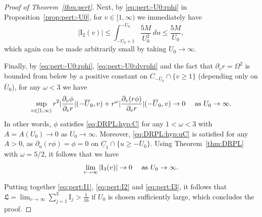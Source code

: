 \documentclass[12 pt, reqno]{amsart}
\theoremstyle{definition}
\theoremstyle{remark}
\numberwithin{equation}{section}
\newcommand{\abs}[1]{\vert#1\vert}
\newcommand{\set}[1]{\{#1\}}
\newcommand{\ud}{d}
\newcommand{\rd}{\partial}
\newcommand{\0}{\emptyset}
\newcommand{\omg}{\omega}
\newcommand{\Omg}{\Omega}
\newcommand{\uC}{\underline{C}}
\newcommand{\Ufree}{U_{0}}
\newcommand{\Ufixed}{\overline{U}_{0}}
\begin{document}
\begin{proof} [Proof of Theorem~\ref{thm:pert}]
Next, by \eqref{eq:pert:-U0:rphi} in Proposition~\ref{prop:pert:-U0}, for $v \in [1, \infty)$ we immediately have
\begin{equation} \label{eq:pert:I2}
	\abs{\mathrm{I_{2}}(v)} \leq \int_{-\Ufree+1}^{-\Ufixed} \frac{5M}{\Ufree^{2}} \, \ud u \leq \frac{5M}{\Ufree},
\end{equation}
which again can be made arbitrarily small by taking $\Ufree \to \infty$.

Finally, by \eqref{eq:pert:-U0:rphi}, \eqref{eq:pert:-U0:dvrphi} and the fact that $\rd_{v} r = \Omg^2$ is bounded from below by a positive constant on $C_{-\Ufixed} \cap \set{v \geq 1}$ (depending only on $\Ufixed$), for any $\omg < 3$ we have
\begin{equation*}
	\sup_{v \in [1, \infty)} r^{2} \abs{\frac{\rd_{v} \phi}{\rd_{v} r}}(-\Ufixed, v) + r^{\omg} \abs{\frac{\rd_{v}(r \phi)}{\rd_{v} r}} (-\Ufixed, v)  \to 0 \quad \hbox{ as } \Ufree \to \infty.
\end{equation*}
In other words, $\phi$ satisfies \eqref{eq:DRPL:hyp:C} for any $1 < \omg < 3$ with $A = A(\Ufree) \to 0$ as $\Ufree \to \infty$. Moreover, \eqref{eq:DRPL:hyp:uC} is satisfied for any $A > 0$, as $\rd_{u}(r \phi) = \phi = 0$ on $\uC_{1} \cap \set{u \geq -\Ufixed}$. Using Theorem~\ref{thm:DRPL} with $\omg = 5/2$, it follows that we have
\begin{equation} \label{eq:pert:I3}
	\lim_{v \to \infty} \abs{\mathrm{I_{3}}(v)} \to 0 \quad \hbox{ as } \Ufree \to \infty.
\end{equation}

Putting together \eqref{eq:pert:I1}, \eqref{eq:pert:I2} and \eqref{eq:pert:I3}, it follows that $\mathfrak{L} = \lim_{v \to \infty} \sum_{j=1}^{3} \mathrm{I}_{j} > \frac{1}{16}$ if $\Ufree$ is chosen sufficiently large, which concludes the proof. \qedhere
\end{proof}



\end{document}
